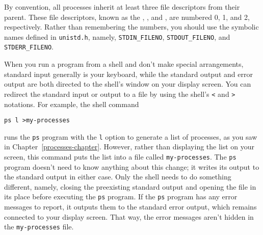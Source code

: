 By convention, all processes inherit at least three file descriptors
from their parent.
These file descriptors, known as the ,
, and ,
are numbered 0, 1, and 2, respectively.  Rather than
remembering the numbers, you should use the symbolic names defined in
\verb|unistd.h|, namely, \verb|STDIN_FILENO|, \verb|STDOUT_FILENO|, and
\verb|STDERR_FILENO|.

When you run a program from a shell and don't make special
arrangements, standard input generally is your keyboard, while the
standard output and error output are both directed to the shell's
window on your display screen.  You can redirect the standard input or
output to a file by using the shell's \verb|<| and \verb|>|
notations.  For example, the shell command
\begin{verbatim}
ps l >my-processes
\end{verbatim}
runs the \verb|ps| program with the \verb|l| option to generate a
list of processes, as you saw in Chapter~\ref{processes-chapter}.  However, rather
than displaying the list on your screen, this command puts the list
into a file called \verb|my-processes|.  The \verb|ps| program doesn't
need to know anything about this change; it  writes its output
to the standard output in either case.  Only the shell needs to do
something different, namely, closing the preexisting standard output
and opening the file in its place before executing the
\verb|ps| program.
If the \verb|ps| program has any error messages to
report, it outputs them to the standard error output, which remains
connected to your display screen.  That way, the error messages aren't
hidden in the \verb|my-processes| file.


